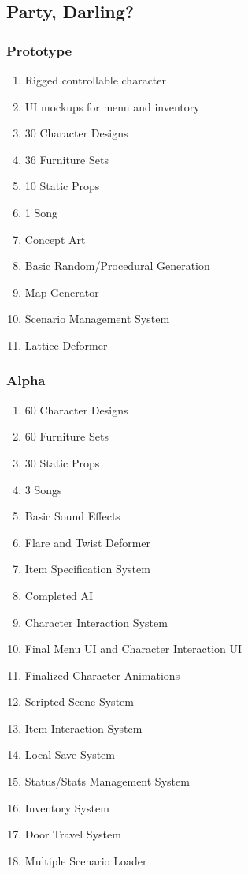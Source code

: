 \documentclass{GlobalDocument}
\begin{document}
\subsection{Party, Darling?}

\subsubsection{Prototype} 
\begin{enumerate}
\item Rigged controllable character
\item UI mockups for menu and inventory
\item 30 Character Designs
\item 36 Furniture Sets
\item 10 Static Props
\item 1 Song
\item Concept Art
\item Basic Random/Procedural Generation
\item Map Generator
\item Scenario Management System
\item Lattice Deformer
\end{enumerate}

\subsubsection{Alpha}
\begin{enumerate}
\item 60 Character Designs
\item 60 Furniture Sets
\item 30 Static Props
\item 3 Songs
\item Basic Sound Effects
\item Flare and Twist Deformer
\item Item Specification System
\item Completed AI
\item Character Interaction System
\item Final Menu UI and Character Interaction UI
\item Finalized Character Animations
\item Scripted Scene System
\item Item Interaction System
\item Local Save System
\item Status/Stats Management System
\item Inventory System
\item Door Travel System
\item Multiple Scenario Loader
\end{enumerate}
\end{document}
